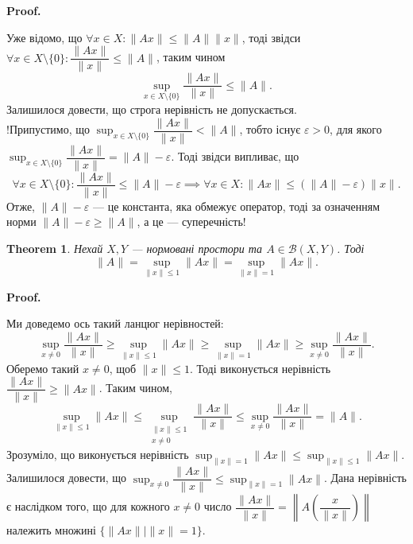 \documentclass[a4paper, 10pt]{article}
\makeatletter
\theoremstyle{theoremdd}
\newtheorem{theorem}{Theorem}[subsection]
\theoremstyle{theoremdd}
\theoremstyle{theoremdd}
\theoremstyle{theoremdd}
\theoremstyle{theoremdd}
\theoremstyle{theoremdd}
\theoremstyle{theoremdd}
\theoremstyle{theoremdd}
\renewenvironment{proof}[1][Proof.\\]{\par
\pushQED{\hfill \qed}%
\normalfont \topsep6\p@\@plus6\p@\relax
\trivlist
\item\relax
{\bfseries
#1\@addpunct{.}}\hspace\labelsep\ignorespaces
}{%
\popQED\endtrivlist\@endpefalse
}
\makeatother
\begin{document}
\begin{proof}
Уже відомо, що $\forall x \in X: \|Ax \| \leq \|A \| \|x\|$, тоді звідси $\forall x \in X \setminus \{0\}: \dfrac{\|Ax\|}{\|x\|} \leq \|A\|$, таким чином 
\[
\sup_{x \in X \setminus \{0\}} \dfrac{\|Ax\|}{\|x\|} \leq \|A\|.
\]
Залишилося довести, що строга нерівність не допускається.\\
!Припустимо, що $\displaystyle\sup_{x \in X \setminus \{0\}} \dfrac{\|Ax\|}{\|x\|} < \|A\|$, тобто існує $\varepsilon > 0$, для якого $\displaystyle\sup_{x \in X \setminus \{0\}} \dfrac{\|Ax\|}{\|x\|} = \|A\|- \varepsilon$. Тоді звідси випливає, що 
\[
\forall x \in X \setminus \{0\}: \dfrac{\|Ax\| }{\|x\|} \leq \|A\| - \varepsilon \implies \forall x \in X: \|Ax\| \leq (\|A\|-\varepsilon) \|x\|.
\]
Отже, $\|A\|-\varepsilon$ --- це константа, яка обмежує оператор, тоді за означенням норми $\|A\| - \varepsilon \geq \|A\|$, а це --- суперечність!
\end{proof}

\begin{theorem}
Нехай $X,Y$ --- нормовані простори та $A \in \mathcal{B}(X,Y)$. Тоді 
\[
\|A\| = \sup_{\|x\| \leq 1} \|Ax\| = \sup_{\|x\| = 1} \|Ax\|.
\]
\end{theorem}

\begin{proof}
Ми доведемо ось такий ланцюг нерівностей:
\[
\displaystyle\sup_{x \neq 0} \dfrac{\|Ax\|}{\|x\|} \geq \sup_{\|x\|\leq 1} \|Ax\| \geq \sup_{\|x\| = 1} \|Ax\| \geq \sup_{x \neq 0} \dfrac{\|Ax\|}{\|x\|}.
\]
Оберемо такий $x \neq 0$, щоб $\|x\| \leq 1$. Тоді виконується нерівність $\dfrac{\|Ax\|}{\|x\|} \geq \|A x\|$. Таким чином, 
\[
\sup_{\|x\| \leq 1} \|Ax\| \leq \sup_{\substack{\|x\| \leq 1 \\ x \neq 0 }} \dfrac{\|Ax\|}{\|x\|} \leq \sup_{x \neq 0} \dfrac{\|Ax\|}{\|x\|} = \|A\|.
\]
Зрозуміло, що виконується нерівність $\displaystyle\sup_{\|x\| = 1} \|Ax\| \leq \sup_{\|x\| \leq 1} \|Ax\|$.\\
Залишилося довести, що $\displaystyle\sup_{x \neq 0} \dfrac{\|Ax\|}{\|x\|} \leq \sup_{\|x\|=  1} \|Ax\|$. Дана нерівність є наслідком того, що для кожного $x \neq 0$ число $\dfrac{\|Ax\|}{\|x\|} = \left\| A \left( \dfrac{x}{\|x\|} \right) \right\|$ належить множині $\{ \|Ax\| \mid \|x\| = 1\}$.
\end{proof}
\end{document}
